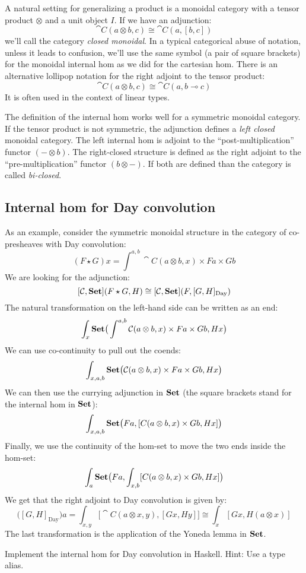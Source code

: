 \documentclass[DaoFP]{subfiles}
\begin{document}
A natural setting for generalizing a product is a monoidal category with a tensor product $\otimes$ and a unit object $I$. If we have an adjunction:
\[ \cat C (a \otimes b, c) \cong \cat C (a, [b, c]) \]
we'll call the category \emph{closed monoidal}. In a typical categorical abuse of notation, unless it leads to confusion, we'll use the same symbol (a pair of square brackets)  for the monoidal internal hom as we did for the cartesian hom. There is an alternative lollipop notation for the right adjoint to the tensor product:
\[ \cat C (a \otimes b, c) \cong \cat C (a, b \multimap c) \]
It is often used in the context of linear types.

The definition of the internal hom works well for a symmetric monoidal category. If the tensor product is not symmetric, the adjunction defines a \emph{left closed} monoidal category. The left internal hom is adjoint to the ``post-multiplication'' functor $(- \otimes b)$. The right-closed structure is defined as the right adjoint to the ``pre-multiplication'' functor $(b \otimes -)$. If both are defined than the category is called \emph{bi-closed}.


\subsection{Internal hom for Day convolution}

As an example, consider the symmetric monoidal structure in the category of co-presheaves with Day convolution:
\[ (F \star G) x = \int^{a, b} \cat C (a \otimes b, x) \times F a \times G b \]
We are looking for the adjunction:
\[ [\mathcal{C}, \mathbf{Set}] (F \star G, H) \cong  [\mathcal{C}, \mathbf{Set}] (F, [G, H]_{\text{Day}}) \]
The natural transformation on the left-hand side can be written as an end:
\[ \int_x \mathbf{Set} \big( \int^{a, b} \mathcal{C} (a \otimes b, x) \times F a \times G b, H x \big) \]
We can use co-continuity to pull out the coends:
\[ \int_{x, a, b} \mathbf{Set} \big( \mathcal{C} (a \otimes b, x) \times F a \times G b, H x \big) \]
We can then use the currying adjunction in $\mathbf{Set}$ (the square brackets stand for the internal hom in $\mathbf{Set}$):
\[ \int_{x, a, b} \mathbf{Set} \big( F a, [C (a \otimes b, x)  \times G b, H x] \big) \]
Finally, we use the continuity of the hom-set to move the two ends inside the hom-set:
\[ \int_{a} \mathbf{Set} \big( F a, \int_{x, b} [C (a \otimes b, x)  \times G b, H x] \big) \]
We get that the right adjoint to Day convolution is given by:
\[ \big([G, H]_{\text{Day}}\big) a = \int_{x, y} \big[\cat C(a \otimes x, y), [G x, H y]\big] \cong \int_x [G x, H (a \otimes x)]\]
The last transformation is the application of the Yoneda lemma in $\mathbf{Set}$.
\begin{exercise}
Implement the internal hom for Day convolution in Haskell. Hint: Use a type alias.
\end{exercise}
\end{document}
